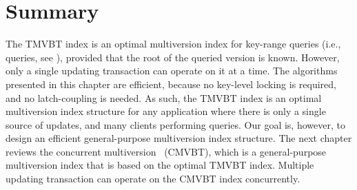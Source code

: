 \section{Summary}
\label{sec:tmvbt:summary}

The TMVBT index is an optimal multiversion index for key-range queries (i.e.,
 queries, see ), provided
that the root of the queried version is known. 
However, only a single updating transaction can operate on it at a time.
The algorithms presented in this chapter are efficient, because no
key-level locking is required, and no latch-coupling is needed. 
As such, the TMVBT index is an optimal multiversion index structure for any
application where there is only a single source of updates, and many
clients performing queries.
Our goal is, however, to design an efficient general-purpose multiversion
index structure.
The next chapter reviews the concurrent multiversion \Btree\ (CMVBT), which
is a general-purpose multiversion index that is based on the optimal TMVBT
index.
Multiple updating transaction can operate on the CMVBT index concurrently.

